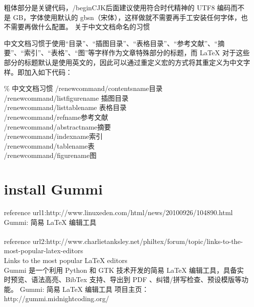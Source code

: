 \documentclass{article}
\begin{document}
粗体部分是关键代码，/begin{CJK}后面建议使用符合时代精神的 UTF8 编码而不是 GB，字体使用默认的 gbsn（宋体），这样做就不需要再手工安装任何字体，也不需要再做什么配置。
关于中文文档命名的习惯

中文文档习惯于使用“目录”、“插图目录”、“表格目录”、“参考文献”、“摘要”、“索引”、“表格”、“图”等字样作为文章特殊部分的标题，而 LaTeX 对于这些部分的标题默认是使用英文的，因此可以通过重定义宏的方式将其重定义为中文字样。即加入如下代码：

\% 中文文档习惯 /renewcommand{/contentsname}{目录}\\
/renewcommand{/listfigurename} {插图目录}\\
/renewcommand{/listtablename} {表格目录}\\
/renewcommand{/refname}{参考文献}\\
/renewcommand{/abstractname}{摘要}\\
/renewcommand{/indexname}{索引}\\
/renewcommand{/tablename}{表}\\
/renewcommand{/figurename}{图}\\

\section{install Gummi}
reference url1:http://www.linuxeden.com/html/news/20100926/104890.html\\
Gummi: 简易 LaTeX 编辑工具\\
\\
reference url2:http://www.charlietanksley.net/philtex/forum/topic/links-to-the-most-popular-latex-editors\\
Links to the most popular LaTeX editors\\

Gummi 是一个利用 Python 和 GTK 技术开发的简易 LaTeX 编辑工具，具备实时预览、语法高亮、BibTex 支持、导出到 PDF 、纠错/拼写检查、预设模版等功能。
Gummi: 简易 LaTeX 编辑工具
项目主页： http://gummi.midnightcoding.org/
\end{document}
